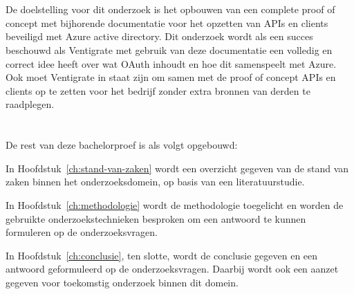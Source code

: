 \section{}
\label{sec:onderzoeksdoelstelling}

De doelstelling voor dit onderzoek is het opbouwen van een complete proof of concept met bijhorende documentatie voor het opzetten van APIs en clients beveiligd met Azure active directory. Dit onderzoek wordt als een succes beschouwd als Ventigrate met gebruik van deze documentatie een volledig en correct idee heeft over wat OAuth inhoudt en hoe dit samenspeelt met Azure. Ook moet Ventigrate in staat zijn om samen met de proof of concept APIs en clients op te zetten voor het bedrijf zonder extra bronnen van derden te raadplegen.

\section{}
\label{sec:opzet-bachelorproef}


De rest van deze bachelorproef is als volgt opgebouwd:

In Hoofdstuk~\ref{ch:stand-van-zaken} wordt een overzicht gegeven van de stand van zaken binnen het onderzoeksdomein, op basis van een literatuurstudie.

In Hoofdstuk~\ref{ch:methodologie} wordt de methodologie toegelicht en worden de gebruikte onderzoekstechnieken besproken om een antwoord te kunnen formuleren op de onderzoeksvragen.


In Hoofdstuk~\ref{ch:conclusie}, ten slotte, wordt de conclusie gegeven en een antwoord geformuleerd op de onderzoeksvragen. Daarbij wordt ook een aanzet gegeven voor toekomstig onderzoek binnen dit domein.